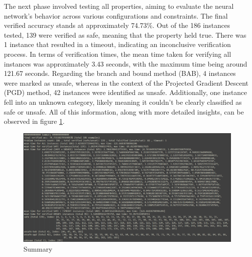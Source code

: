 \par The next phase involved testing all properties, aiming to evaluate the neural network's behavior across various configurations and constraints. The final verified accuracy stands at approximately 74.73\%. Out of the 186 instances tested, 139 were verified as safe, meaning that the property held true. There was 1 instance that resulted in a timeout, indicating an inconclusive verification process. In terms of verification times, the mean time taken for verifying all instances was approximately 3.43 seconds, with the maximum time being around 121.67 seconds. Regarding the branch and bound method (BAB), 4 instances were marked as unsafe, whereas in the context of the Projected Gradient Descent (PGD) method, 42 instances were identified as unsafe. Additionally, one instance fell into an unknown category, likely meaning it couldn't be clearly classified as safe or unsafe. All of this information, along with more detailed insights, can be observed in figure \ref{Fig_Summary}.

\begin{figure}[htbp]
	\centering
		\includegraphics[width=15cm]{./Figures/summary.png}
	\caption{Summary}
	\label{Fig_Summary}
\end{figure}